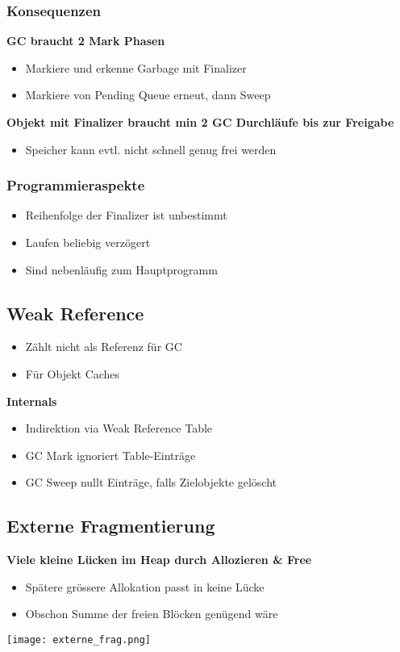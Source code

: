 \subsubsection{Konsequenzen}
\textbf{GC braucht 2 Mark Phasen}
\begin{itemize}
    \item Markiere und erkenne Garbage mit Finalizer
    \item Markiere von Pending Queue erneut, dann Sweep
\end{itemize}
\textbf{Objekt mit Finalizer braucht min 2 GC Durchläufe bis zur Freigabe}
\begin{itemize}
    \item Speicher kann evtl. nicht schnell genug frei werden
\end{itemize}

\subsubsection{Programmieraspekte}
\begin{itemize}
    \item Reihenfolge der Finalizer ist unbestimmt
    \item Laufen beliebig verzögert
    \item Sind nebenläufig zum Hauptprogramm
\end{itemize}

\subsection{Weak Reference}
\begin{itemize}
    \item Zählt nicht als Referenz für GC
    \item Für Objekt Caches
\end{itemize}
\textbf{Internals}
\begin{itemize}
    \item Indirektion via Weak Reference Table
    \item GC Mark ignoriert Table-Einträge
    \item GC Sweep nullt Einträge, falls Zielobjekte gelöscht
\end{itemize}

\subsection{Externe Fragmentierung}
\textbf{Viele kleine Lücken im Heap durch Allozieren \& Free}
\begin{itemize}
    \item Spätere grössere Allokation passt in keine Lücke
    \item Obschon Summe der freien Blöcken genügend wäre
\end{itemize}
\texttt{[image: externe\_frag.png]}

